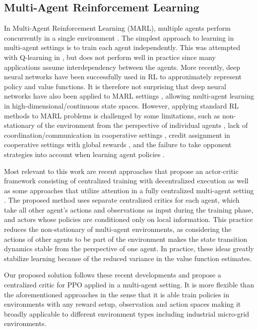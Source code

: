 \subsection{Multi-Agent Reinforcement Learning}
In Multi-Agent Reinforcement Learning (MARL), multiple agents perform concurrently in a single environment \cite{Littman1994multiagent, Hu1998MultiagentRL, Busoniu4445757, Tan93multiagentreinforcement}.  The simplest approach to learning in multi-agent settings is to train each agent independently. This was attempted with Q-learning in \cite{Tan93multiagentreinforcement}, but does not perform well in practice \cite{Matignon2012IndependentRL} since many applications assume interdependency between the agents. More recently, deep neural networks have been successfully used in RL to approximately represent policy and value functions. It is therefore not surprising that deep neural networks have also been applied to MARL settings \cite{tampuu2015multiagent, Gupta71682}, allowing multi-agent learning in high-dimensional/continuous state spaces. However, applying standard RL methods to MARL problems is  challenged by some limitations, such as non-stationary of the environment from the perspective of individual agents \cite{foerster2017stabilising, Lowe2017MultiAgentAF, Foerster2017CounterfactualMP}, lack of coordination/communication in cooperative settings \cite{Lowe2017MultiAgentAF, NIPS2016_6398, MordatchA17, FoersterAFW16a}, credit assignment in cooperative settings with global rewards \cite{Foerster2017CounterfactualMP, Rashid2018,Sunehag3238080}, and the failure to take opponent strategies into account when learning agent policies \cite{He3045581}.

Most relevant to this work are recent approaches \cite{MordatchA17, Foerster2017CounterfactualMP} that propose an actor-critic framework consisting of centralized training with decentralized execution as well as some approaches that utilize attention in a fully centralized multi-agent setting \cite{Choi2017MultifocusAN, Jiang3327828}. The proposed method uses separate centralized critics for each agent, which take all other agent’s actions and observations as input during the training phase, and  actors whose policies are conditioned only on local information. This practice reduces the non-stationary of multi-agent environments, as considering the actions of other agents to be part of the environment makes the state transition dynamics stable from the perspective of one agent. In practice, these ideas greatly stabilize learning because of the reduced variance in the value function estimates.

Our proposed solution follows these recent developments and propose a centralized critic for PPO applied in a multi-agent setting. It is more flexible than the aforementioned approaches in the sense that it is able train policies in environments with any reward setup, observation and action spaces making it broadly applicable to different environment types including industrial micro-grid environments.


